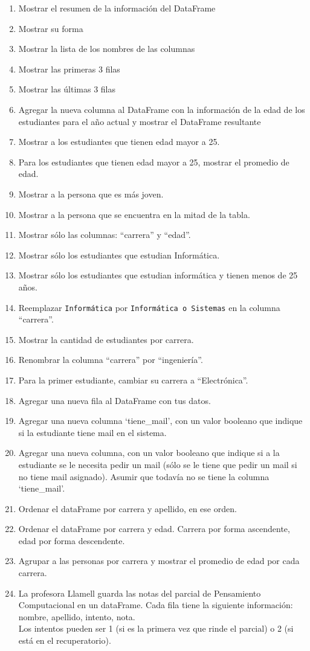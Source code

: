 \documentclass[
  letterpaper,
  DIV=11,
  numbers=noendperiod]{scrreprt}
\begin{document}
\begin{enumerate}
\def\labelenumi{\arabic{enumi}.}
\item
  Mostrar el resumen de la información del DataFrame
\item
  Mostrar su forma
\item
  Mostrar la lista de los nombres de las columnas
\item
  Mostrar las primeras 3 filas
\item
  Mostrar las últimas 3 filas
\item
  Agregar la nueva columna al DataFrame con la información de la edad de
  los estudiantes para el año actual y mostrar el DataFrame resultante
\item
  Mostrar a los estudiantes que tienen edad mayor a 25.
\item
  Para los estudiantes que tienen edad mayor a 25, mostrar el promedio
  de edad.
\item
  Mostrar a la persona que es más joven.
\item
  Mostrar a la persona que se encuentra en la mitad de la tabla.
\item
  Mostrar sólo las columnas: ``carrera'' y ``edad''.
\item
  Mostrar sólo los estudiantes que estudian Informática.
\item
  Mostrar sólo los estudiantes que estudian informática y tienen menos
  de 25 años.
\item
  Reemplazar \texttt{Informática} por \texttt{Informática\ o\ Sistemas}
  en la columna ``carrera''.
\item
  Mostrar la cantidad de estudiantes por carrera.
\item
  Renombrar la columna ``carrera'' por ``ingeniería''.
\item
  Para la primer estudiante, cambiar su carrera a ``Electrónica''.
\item
  Agregar una nueva fila al DataFrame con tus datos.
\item
  Agregar una nueva columna `tiene\_mail', con un valor booleano que
  indique si la estudiante tiene mail en el sistema.
\item
  Agregar una nueva columna, con un valor booleano que indique si a la
  estudiante se le necesita pedir un mail (sólo se le tiene que pedir un
  mail si no tiene mail asignado). Asumir que todavía no se tiene la
  columna `tiene\_mail'.
\item
  Ordenar el dataFrame por carrera y apellido, en ese orden.
\item
  Ordenar el dataFrame por carrera y edad. Carrera por forma ascendente,
  edad por forma descendente.
\item
  Agrupar a las personas por carrera y mostrar el promedio de edad por
  cada carrera.
\item
  La profesora Llamell guarda las notas del parcial de Pensamiento
  Computacional en un dataFrame. Cada fila tiene la siguiente
  información: nombre, apellido, intento, nota.\\
  Los intentos pueden ser 1 (si es la primera vez que rinde el parcial)
  o 2 (si está en el recuperatorio).\\
\end{enumerate}
\end{document}
